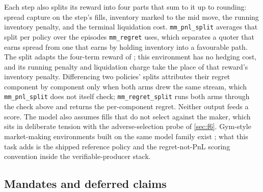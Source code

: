 Each step also splits its reward into four parts that sum to it up to rounding: spread capture on the step's fills, inventory marked to the mid move, the running inventory penalty, and the terminal liquidation cost. \texttt{mm\_pnl\_split} averages that split per policy over the episodes \texttt{mm\_regret} uses, which separates a quoter that earns spread from one that earns by holding inventory into a favourable path. The split adapts the four-term reward of \citet[Eq.~4.1, PDF p.~67]{fernandezvicente2025market}; this environment has no hedging cost, and its running penalty and liquidation charge take the place of that reward's inventory penalty. Differencing two policies' splits attributes their regret component by component only when both arms drew the same stream, which \texttt{mm\_pnl\_split} does not itself check; \texttt{mm\_regret\_split} runs both arms through the check above and returns the per-component regret. Neither output feeds a score. The model also assumes fills that do not select against the maker, which sits in deliberate tension with the adverse-selection probe of \cref{sec:f6}. Gym-style market-making environments built on the same model family exist \citep{jerome2023mbtgym}; what this task adds is the shipped reference policy and the regret-not-PnL scoring convention inside the verifiable-producer stack.

\subsection{Mandates and deferred claims}\label{sec:mandates}

